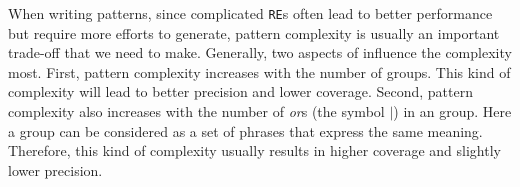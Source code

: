 When writing \RE patterns, since complicated \texttt{RE}s often lead to better performance but require more efforts to generate, pattern complexity is usually an important trade-off that we need to make. Generally, two aspects of \RE influence the complexity most. First, pattern complexity increases with the number of \RE groups. This kind of complexity will lead to better precision and lower coverage. Second, pattern complexity also increases with the number of \emph{or}s (the symbol $|$) in an \RE group. Here a group can be considered as a set of phrases that express the same meaning. Therefore, this kind of complexity usually results in higher coverage and slightly lower precision. 




